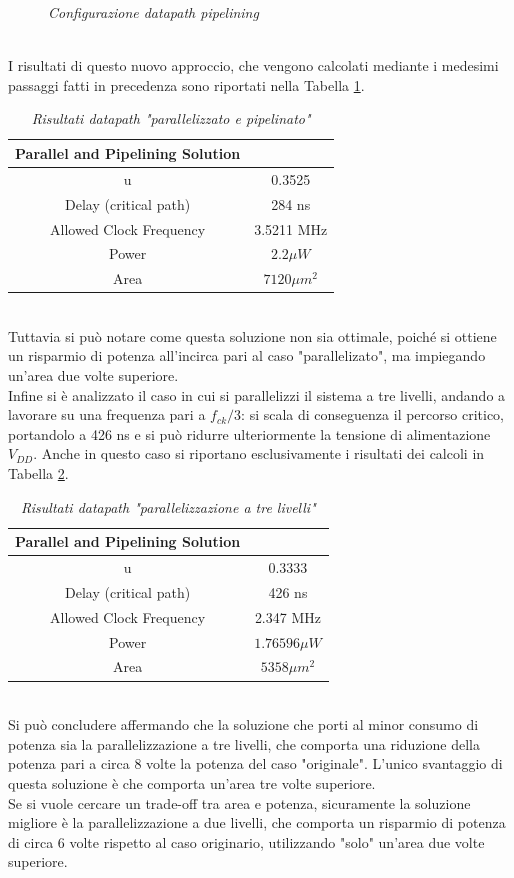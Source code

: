 {\begin{figure}[!htb]
	\caption{\textit{Configurazione datapath pipelining}}
	\label{circuito_parallel_pipe}
\end{figure}\\
I risultati di questo nuovo approccio, che vengono calcolati mediante i medesimi passaggi fatti in precedenza sono riportati nella Tabella \ref{Tab33_7}.
\begin{table}[!h]\footnotesize
	\centering
	\begin{tabular}{|c|c|}
		\hline
		\textbf{Parallel and Pipelining Solution} & \\
		\hline
		u &0.3525\\
		Delay (critical path) & 284 ns\\
		Allowed Clock Frequency & 3.5211 MHz\\
		Power & $2.2\mu W$\\
		Area & $7120 \mu m^{2}$\\
		\hline
	\end{tabular}
	\caption{\textit{Risultati datapath "parallelizzato e pipelinato"}}
	\label{Tab33_7}
\end{table}\\
Tuttavia si può notare come questa soluzione non sia ottimale, poiché si ottiene un risparmio di potenza all'incirca pari al caso "parallelizato", ma impiegando un'area due volte superiore.\\
Infine si è analizzato il caso in cui si parallelizzi il sistema a tre livelli, andando a lavorare su una frequenza pari a $f_{ck}/3$: si scala di conseguenza il percorso critico, portandolo a 426 ns e si può ridurre ulteriormente la tensione di alimentazione $V_{DD}$. Anche in questo caso si riportano esclusivamente i risultati dei calcoli in Tabella \ref{Tab33_8}. 
\begin{table}[!h]\footnotesize
	\centering
	\begin{tabular}{|c|c|}
		\hline
		\textbf{Parallel and Pipelining Solution} & \\
		\hline
		u &0.3333\\
		Delay (critical path) & 426 ns\\
		Allowed Clock Frequency & 2.347 MHz\\
		Power & $1.76596\mu W$\\
		Area & $5358 \mu m^{2}$\\
		\hline
	\end{tabular}
	\caption{\textit{Risultati datapath "parallelizzazione a tre livelli"}}
	\label{Tab33_8}
\end{table}\\
Si può concludere affermando che la soluzione che porti al minor consumo di potenza sia la parallelizzazione a tre livelli, che comporta una riduzione della potenza pari a circa 8 volte la potenza del caso "originale". L'unico svantaggio di questa soluzione è che comporta un'area tre volte superiore.\\
Se si vuole cercare un trade-off tra area e potenza, sicuramente la soluzione migliore è la parallelizzazione a due livelli, che comporta un risparmio di potenza di circa 6 volte rispetto al caso originario, utilizzando "solo" un'area due volte superiore.\\
}
